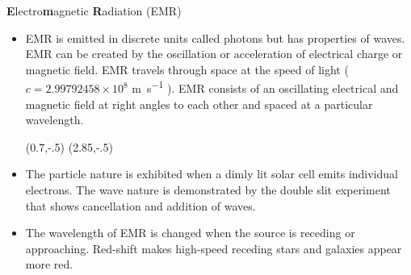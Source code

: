 {\Large {\bfseries E}lectro{\bfseries m}agnetic {\bfseries R}adiation (EMR)}
\begin{itemize}
\item EMR is emitted in discrete units called photons but has properties of waves. EMR can be created by the oscillation or acceleration of electrical charge or magnetic field. EMR travels through space at the speed of light ($c=2.997 924 58 \times 10^{8}$ \si{\metre\per\second} ). EMR consists of an oscillating electrical and magnetic field at right angles to each other and spaced at a particular wavelength.

(0.7,-.5){}
(2.85,-.5){}

\vspace{1.45in}

\item The particle nature is exhibited when a dimly lit solar cell emits individual electrons. The wave nature is demonstrated by the double slit experiment that shows cancellation and addition of waves.



\item The wavelength of EMR is changed when the source is receding or approaching. Red-shift makes high-speed receding stars and galaxies appear more red.

% 


\end{itemize}
